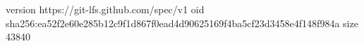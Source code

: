 version https://git-lfs.github.com/spec/v1
oid sha256:ea52f2e60e285b12c9f1d867f0ead4d90625169f4ba5cf23d3458e4f148f984a
size 43840
